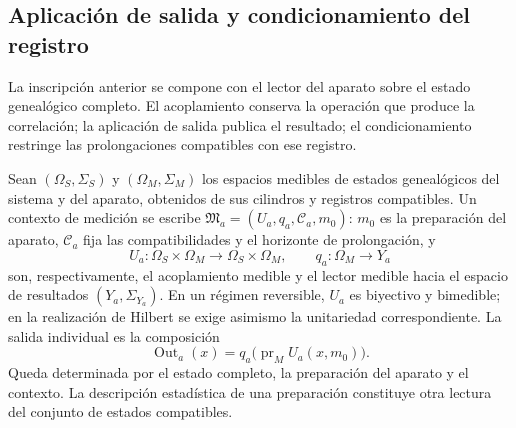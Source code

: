 \subsection{Aplicación de salida y condicionamiento del registro}
\label{vii:sec:salida-condicionamiento}

La inscripción anterior se compone con el lector del aparato sobre el
estado genealógico completo. El acoplamiento conserva la operación que
produce la correlación; la aplicación de salida publica el resultado; el
condicionamiento restringe las prolongaciones compatibles con ese registro.

Sean \((\Omega_S,\Sigma_S)\) y \((\Omega_M,\Sigma_M)\) los espacios
medibles de estados genealógicos del sistema y del aparato, obtenidos de
sus cilindros y registros compatibles. Un contexto de medición se escribe
\(\mathfrak M_a=(U_a,q_a,\mathcal C_a,m_0)\): \(m_0\) es la
preparación del aparato, \(\mathcal C_a\) fija las compatibilidades y el
horizonte de prolongación, y
\[
 U_a:\Omega_S\times\Omega_M\longrightarrow\Omega_S\times\Omega_M,
 \qquad q_a:\Omega_M\longrightarrow Y_a
\]
son, respectivamente, el acoplamiento medible y el lector medible hacia
el espacio de resultados \((Y_a,\Sigma_{Y_a})\). En un régimen reversible,
\(U_a\) es biyectivo y bimedible; en la realización de Hilbert se exige
asimismo la unitariedad correspondiente. La salida individual es la composición
\begin{equation}
 \operatorname{Out}_a(x)
 =q_a\bigl(\operatorname{pr}_M U_a(x,m_0)\bigr).
 \label{vii:eq:out-genealogico}
\end{equation}
Queda determinada por el estado completo, la preparación del aparato y
el contexto. La descripción estadística de una preparación constituye
otra lectura del conjunto de estados compatibles.

